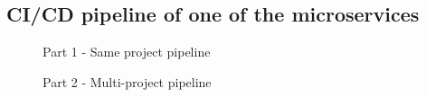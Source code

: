 \begin{appendices}
    \section{CI/CD pipeline of one of the microservices}
    \begin{figure}[H]
        \centering
        \caption*{Part 1 - Same project pipeline}
    \end{figure}
    \begin{figure}[H]
        \centering
        \caption*{Part 2 - Multi-project pipeline}
    \end{figure}


\end{appendices}
